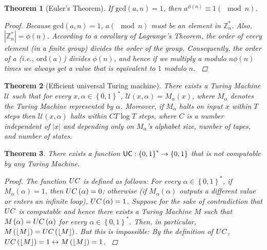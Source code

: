 \documentclass{book}
\newcommand{\fun}[2]{\ensuremath{#1\left(#2\right)}}
\newcommand{\funsig}[3]{\ensuremath{#1:#2 \rightarrow #3}}
\newcommand{\binary}{\ensuremath{\left\{0,1\right\}}}
\newcommand{\binarystrings}{\ensuremath{\left\{0,1\right\}^*}}
\newcommand{\btoblfun}[1]{\funsig{#1}{\binarystrings}{\binary}}
\newcommand{\gcdf}[1]{\fun{\mbox{gcd}}{#1}}
\newcommand{\phif}[1]{\fun{\phi}{#1}}
\newcommand{\ordf}[1]{\fun{\mbox{ord}}{#1}}
\newcommand{\ZZZ}{\ensuremath{\mathbb{Z}}}
\newtheorem{theo}{Theorem}
\begin{document}
\begin{theo}[Euler's Theorem]
If $\gcdf{a,n}=1$, then $a^{\fun{\phi}{n}}\equiv 1\left(\mod n\right)$.
\begin{proof}
Because $\gcdf{a,n}=1$, $a \left(\mod n\right)$ must be an element in $\ZZZ^*_n$. Also, $\left|\ZZZ^*_n\right|=\fun{\phi}{n}$. According to a corollary of Lagrange's Theorem, the order of every element (in a finite group) divides the order of the group. Consequently, the order of a (i.e., $\ordf{a}$) divides $\phif{n}$, and hence if we multiply a modulo $n\phif{n}$ times we always get a value that is equivalent to $1$ modulo $n$.
\cite{Oppliger:2011:CC:2049860}
\end{proof}
\end{theo}


\begin{theo}[Efficient universal Turing machine]
\label{theo:eutm}
There exists a Turing Machine $\mathcal{U}$ such that for every $x,\alpha\in\binarystrings$, $\fun{\mathcal{U}}{x,\alpha} = \fun{M_{\alpha}}{x}$, where $M_{\alpha}$ denotes the Turing Machine represented by $\alpha$. Moreover, if $M_{\alpha}$ halts on input $x$ within $T$ steps then $\fun{\mathcal{U}}{x,\alpha}$ halts within $CT\log T$ steps, where $C$ is a number independent of $\left|x\right|$ and depending only on $M_{\alpha}$'s alphabet size, number of tapes, and number of states.
\cite{arora2009computational}
\end{theo}

\begin{theo}
\label{theo:uncomputable}There exists a function $\btoblfun{{\sf UC}}$ that is not computable by any Turing Machine.
\begin{proof}
The function $\sl UC$ is defined as follows: For every $\alpha\in\binarystrings$, if $\fun{M_{\alpha}}{\alpha}=1$, then $\fun{\sl UC}{\alpha}=0$; otherwise (if $\fun{M_{\alpha}}{\alpha}$ outputs a different value or enters an infinite loop), $\fun{\sl UC}{\alpha}=1$. Suppose for the sake of contradiction that ${\sl UC}$ is computable and hence there exists a Turing Machine $M$ such that $\fun{M}{\alpha}=\fun{{\sl UC}}{\alpha}$ for every $\alpha\in\binarystrings$. Then, in particular, $\fun{M}{\left\lfloor M\right\rfloor}=\fun{{\sl UC}}{\left\lfloor M\right\rfloor}$. But this is impossible: By the definition of ${\sl UC}$, $\fun{{\sl UC}}{\left\lfloor M\right\rfloor}=1\leftrightarrow\fun{M}{\left\lfloor M\right\rfloor}=1$.
\cite{arora2009computational}
\end{proof}
\end{theo}
\end{document}
